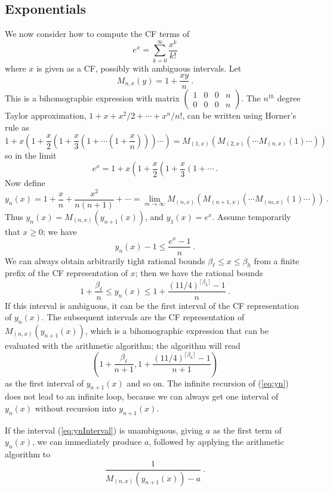 \documentclass[11pt, oneside]{amsart}   	%
\newcommand{\bihomographic}[8]{\left(\begin{smallmatrix}#1&#2&#3&#4\\#5&#6&#7&#8\end{smallmatrix}\right)}
\renewcommand{\:}{\negthickspace:\negthickspace}
\begin{document}
\subsection{Exponentials} We now consider how to compute the CF terms of 
\[
e^x = \sum_{k=0}^{\infty} \frac{x^k}{k!}
\]
where $x$ is given as a CF, possibly with ambiguous intervals. Let
\[
M_{n,x}(y) = 1 + \frac{xy}{n} \ .
\]
This is a bihomographic expression with matrix $\bihomographic{1}{0}{0}{n}{0}{0}{0}{n}$. The $n^{th}$ degree Taylor approximation,
$1 + x + x^2/2 +\cdots + x^n/{n!}$, can be written using Horner's rule as
\[
 1 + x \left(1 + \frac{x}{2}\left( 1 + \frac{x}{3}\left(1 + \cdots \left(1 + \frac{x}{n}\right)\right)\right) \cdots \right) = M_{(1,x)}( M_{(2,x)}( \cdots M_{(n,x)}(1) \cdots ) )
 \]
 so in the limit
 \begin{equation}\label{eq:spigot}
 e^x = 1 + x \left(1 + \frac{x}{2}\left( 1 + \frac{x}{3}\left(1 + \cdots \right. \right.  \right.   \ .
 \end{equation} 
 Now define
 \begin{equation}\label{eq:yn}
 y_n(x) = 1 + \frac{x}{n} + \frac{x^2}{n(n+1)} + \cdots = \lim_{m\to\infty} M_{(n,x)}( M_{(n+1,x)}( \cdots M_{(m,x)}(1) \cdots ) ) \ .
  \end{equation}
Thus $y_n(x) = M_{(n,x)}(y_{n+1}(x))$, and $y_1(x) = e^x$.
Assume temporarily that $x \geq 0$; we have
 \[
 y_n(x) - 1 \leq \frac{e^x - 1}{n} \ .
 \]
  We can always obtain arbitrarily tight rational bounds $\beta_{\ell} \leq x \leq \beta_{h}$ from a finite prefix of the CF representation of $x$; then  we have the rational bounds
 \begin{equation}\label{eq:ynInterval}
  1+\frac{\beta_{\ell}}{n} \leq y_n(x) \leq  1 + \frac{(11/4)^{\lceil\beta_{h}\rceil}-1}{n} \ .
 \end{equation}
 If this interval is ambiguous, it can be the first interval of the CF representation of $y_n(x)$.
The subsequent intervals are the CF representation of $M_{(n,x)}(y_{n+1}(x))$,
which is a bihomographic expression that can be evaluated with the arithmetic algorithm;
the algorithm will read
\[
\left(1+\frac{\beta_{\ell}}{n+1} , 1 + \frac{(11/4)^{\lceil\beta_{h}\rceil}-1}{n+1}\right)
\]
as the first interval of $y_{n+1}(x)$ and so on. The infinite recursion of (\ref{eq:yn}) does not lead to an infinite loop, because we can always get one interval of $y_n(x)$ without recursion into $y_{n+1}(x)$.

If the interval (\ref{eq:ynInterval}) is unambiguous, giving $a$ as the first term of $y_n(x)$, we can immediately produce $a$, followed by applying the arithmetic algorithm to
\[
\frac{1}{M_{(n,x)}(y_{n+1}(x)) - a} \ .
\]
\end{document}
